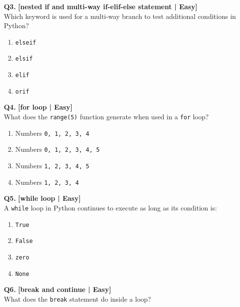 \noindent\textbf{Q3.} \hfill {\small\color{LPUOrange}\textbf{[nested if and multi-way if-elif-else statement | Easy]}}\\[2pt]
Which keyword is used for a multi-way branch to test additional conditions in Python?

\begin{enumerate}[label=(\alph*),topsep=2pt,itemsep=1pt,partopsep=0pt,parsep=0pt]
    \item \relax \texttt{elseif}
    \item \relax \texttt{elsif}
    \item \relax \texttt{elif}
    \item \relax \texttt{orif}
\end{enumerate}
\vspace{2mm}

\noindent\textbf{Q4.} \hfill {\small\color{LPUOrange}\textbf{[for loop | Easy]}}\\[2pt]
What does the \texttt{range(5)} function generate when used in a \texttt{for} loop?

\begin{enumerate}[label=(\alph*),topsep=2pt,itemsep=1pt,partopsep=0pt,parsep=0pt]
    \item \relax Numbers \texttt{0, 1, 2, 3, 4}
    \item \relax Numbers \texttt{0, 1, 2, 3, 4, 5}
    \item \relax Numbers \texttt{1, 2, 3, 4, 5}
    \item \relax Numbers \texttt{1, 2, 3, 4}
\end{enumerate}
\vspace{2mm}

\noindent\textbf{Q5.} \hfill {\small\color{LPUOrange}\textbf{[while loop | Easy]}}\\[2pt]
A \texttt{while} loop in Python continues to execute as long as its condition is:

\begin{enumerate}[label=(\alph*),topsep=2pt,itemsep=1pt,partopsep=0pt,parsep=0pt]
    \item \relax \texttt{True}
    \item \relax \texttt{False}
    \item \relax \texttt{zero}
    \item \relax \texttt{None}
\end{enumerate}
\vspace{2mm}

\noindent\textbf{Q6.} \hfill {\small\color{LPUOrange}\textbf{[break and continue | Easy]}}\\[2pt]
What does the \texttt{break} statement do inside a loop?

